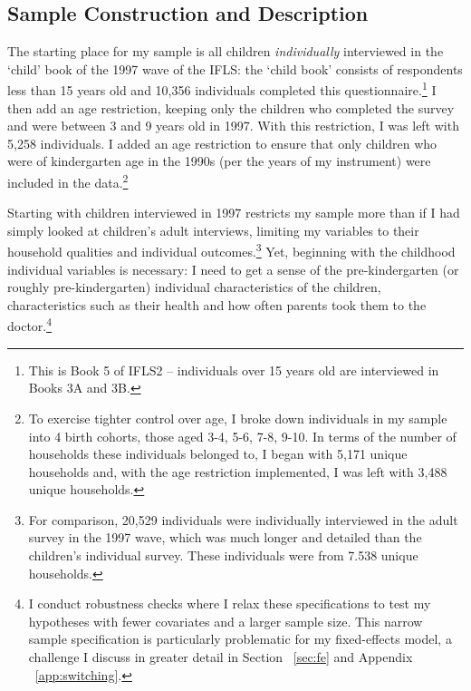 \subsection{Sample Construction and Description}
	\label{sec:sample}
The starting place for my sample is all children \textit{individually} interviewed in the `child' book of the 1997 wave of the IFLS: the `child book' consists of respondents less than 15 years old and 10,356 individuals completed this questionnaire.\footnote{This is Book 5 of IFLS2 -- individuals over 15 years old are interviewed in Books 3A and 3B.} I then add an age restriction, keeping only the children who completed the survey and were between 3 and 9 years old in 1997. With this restriction, I was left with 5,258 individuals. I added an age restriction to ensure that only children who were of kindergarten age in the 1990s (per the years of my instrument) were included in the data.\footnote{To exercise tighter control over age, I broke down individuals in my sample into 4 birth cohorts, those aged 3-4, 5-6, 7-8, 9-10. In terms of the number of households these individuals belonged to, I began with 5,171 unique households and, with the age restriction implemented, I was left with 3,488 unique households.}

Starting with children interviewed in 1997 restricts my sample more than if I had simply looked at children's adult interviews, limiting my variables to their household qualities and individual outcomes.\footnote{For comparison, 20,529 individuals were individually interviewed in the adult survey in the 1997 wave, which was much longer and detailed than the children's individual survey. These individuals were from 7.538 unique households.} Yet, beginning with the childhood individual variables is necessary: I need to get a sense of the pre-kindergarten (or roughly pre-kindergarten) individual characteristics of the children, characteristics such as their health and how often parents took them to the doctor.\footnote{I conduct robustness checks where I relax these specifications to test my hypotheses with fewer covariates and a larger sample size. This narrow sample specification is particularly problematic for my fixed-effects model, a challenge I discuss in greater detail in Section ~\ref{sec:fe} and Appendix ~\ref{app:switching}.} 

